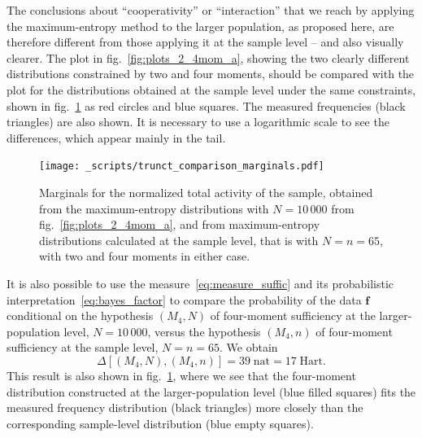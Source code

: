 \documentclass[\ifafour a4paper,12pt,\else a5paper,10pt,\fi%
onecolumn,oneside,article,%
british%
]{memoir}
\theoremstyle{remark}
\theoremstyle{innote}
\renewcommand*{\|}{\nonscript\,\vert\nonscript\;\mathopen{}}
\newcommand*{\fig}{fig.}%
\newcommand*{\yff}{f}
\newcommand*{\yf}{\bm{\yff}}
\newcommand*{\ydi}{\varDelta}
\newcommand*{\nat}{\textrm{nat}}
\newcommand*{\hart}{\textrm{Hart}}
\begin{document}
The conclusions about \enquote{cooperativity} or \enquote{interaction} that
we reach by applying the maximum-entropy method to the larger population,
as proposed here, are therefore different from those applying it at the
sample level -- and also visually clearer. The plot in 
\fig~\ref{fig:plots_2_4mom_a}, showing the two clearly different
distributions constrained by two and four moments, should be compared with
the plot for the distributions obtained at the sample level under the same
constraints, shown in \fig~\ref{fig:comparisons_marginals} as
\textcolor{myred}{red circles} and \textcolor{myblue}{blue squares}. The
measured frequencies (black triangles) are also shown. It is necessary to
use a logarithmic scale to see the differences, which appear mainly in the
tail.
\begin{figure}[!p]
\centering
\texttt{[image: \_scripts/trunct\_comparison\_marginals.pdf]}%
\caption{Marginals for the normalized total activity of the sample,
  obtained from the maximum-entropy distributions with $N=10\,000$ from
  \fig~\ref{fig:plots_2_4mom_a}, and from maximum-entropy distributions
  calculated at the sample level, that is with $N=n=65$, with two and four
  moments in either case.}
\label{fig:comparisons_marginals}
\end{figure}

\medskip


It is also possible to use the measure~\eqref{eq:measure_suffic} and its
probabilistic interpretation~\eqref{eq:bayes_factor} to compare the probability of
the data $\yf$ conditional on the hypothesis $(M_{4},N)$ of four-moment
sufficiency at the larger-population level, $N=10\,000$, versus the
hypothesis $(M_{4}, n)$ of four-moment sufficiency at the sample level,
$N=n=65$. We obtain
\begin{equation}
  \label{eq:diff_suff_n}
  \ydi[(M_{4}, N), (M_{4}, n)] = 39\;\nat = 17\;\hart.
\end{equation}
This result is also shown in
\fig~\ref{fig:comparisons_marginals}, where we see that the four-moment
distribution constructed at the larger-population level
(\textcolor{myblue}{blue filled squares}) fits the measured frequency
distribution (black triangles) more closely than the corresponding
sample-level distribution (\textcolor{myblue}{blue empty squares}).
\end{document}
